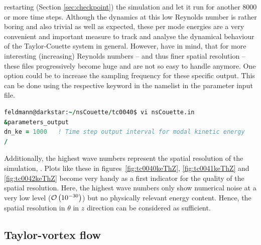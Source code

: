 \documentclass[a4paper, 11pt, DIV=11]{scrartcl}
\begin{document}
restarting (Section \ref{sec:checkpoint}) the simulation and let it run for another
\num{8000} or more time steps. Although the dynamics at this low Reynolds number is
rather boring and also trivial as well as expected, these per mode energies are a
very convenient and important measure to track and analyse the dynamical behaviour
of the Taylor-Couette system in general. However, have in mind, that for more
interesting (\ie increasing) Reynolds numbers -- and thus finer spatial resolution -- these
files progressively become huge and are not so easy to handle anymore. One option
could be to increase the sampling frequency for these specific output. This can be done
using the respective keyword in the namelist  in the parameter input file.
\begin{lstlisting}[language=fortran]
feldmann@darkstar:~/nsCouette/tc0040$ vi nsCouette.in  
&parameters_output
dn_ke = 1000   ! Time step output interval for modal kinetic energy
/
\end{lstlisting}
Additionally, the highest wave numbers represent the spatial resolution
of the simulation, . Plots
like these in figures~\ref{fig:tc0040keThZ}, \ref{fig:tc0041keThZ} and
\ref{fig:tc0042keThZ} become very handy as a first indicator for the quality of the spatial resolution.  Here, the highest wave
numbers only show numerical noise at a very low level
($\mathcal{O}\left(\num{e-30}\right)$) but no physically relevant energy
content. Hence, the spatial resolution in $\theta$ in $z$ direction can
be considered as sufficient.



\subsection{Taylor-vortex flow}
\label{sec:tc0041}
\end{document}
